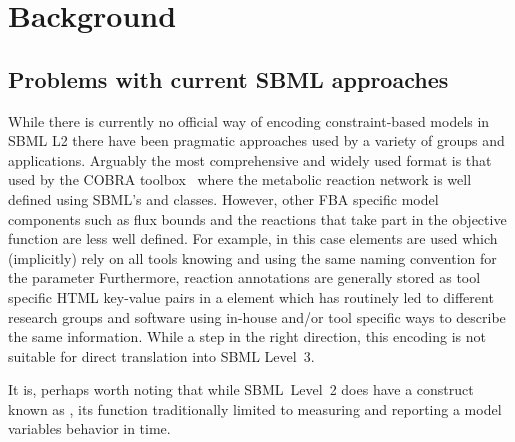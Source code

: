 
\section{Background}
\label{background}

\subsection{Problems with current SBML approaches}

While there is currently no official way of encoding constraint-based models
in SBML L2 there have been pragmatic approaches used by a variety of groups
and applications. Arguably the most comprehensive and widely used format is
that used by the \textsf{COBRA toolbox}~\citep{cobra} where the metabolic
reaction network is well defined using SBML's \Reaction and \Species
classes. However, other FBA specific model components such as flux bounds
and the reactions that take part in the objective function are less well
defined. For example, in this case \LocalParameter elements are used which (implicitly) rely on all tools knowing and using the same naming convention for the parameter  Furthermore, reaction annotations are generally stored as tool specific HTML key-value pairs in a \Notes element which has routinely
led to different research groups and software using in-house and/or tool
specific ways to describe the same information.
%
%
While a step in the right direction, this encoding is not suitable for
direct translation into SBML Level~3.

It is, perhaps  worth noting that while SBML~Level~2 does have a construct known as \Constraint, its function traditionally limited to measuring and reporting a model variables behavior in time. 
%

